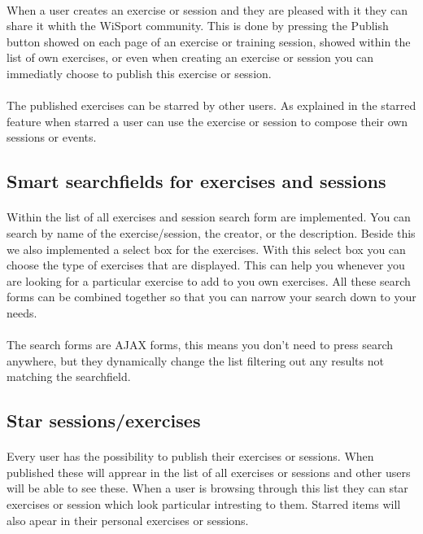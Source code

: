 \documentclass[11pt,a4paper]{scrartcl}
\begin{document}
\paragraph{}When a user creates an exercise or session and they are pleased with it they can share it whith the WiSport community. This is done by pressing the Publish button showed on each page of an exercise or training session, showed within the list of own exercises, or even when creating an exercise or session you can immediatly choose to publish this exercise or session.
\paragraph{}The published exercises can be starred by other users. As explained in the starred feature when starred a user can use the exercise or session to compose their  own sessions or events.
\subsection{Smart searchfields for exercises and sessions}
\paragraph{}Within the list of all exercises and session search form are implemented. You can search by name of the exercise/session, the creator, or the description. Beside this we also implemented a select box for the exercises. With this select box you can choose the type of exercises that are displayed. This can help you whenever you are looking for a particular exercise to add to you own exercises. All these search forms can be combined together so that you can narrow your search down to your needs.
\paragraph{}The search forms are AJAX forms, this means you don't need to press search anywhere, but they dynamically change the list filtering out any results not matching the searchfield.

\subsection{Star sessions/exercises}
\paragraph{}Every user has the possibility to publish their exercises or sessions. When published these will apprear in the list of all exercises or sessions and other users will be able to see these. When a user is browsing through this list they can star exercises or session which look particular intresting to them. Starred items will also apear in their personal exercises or sessions.
\end{document}
